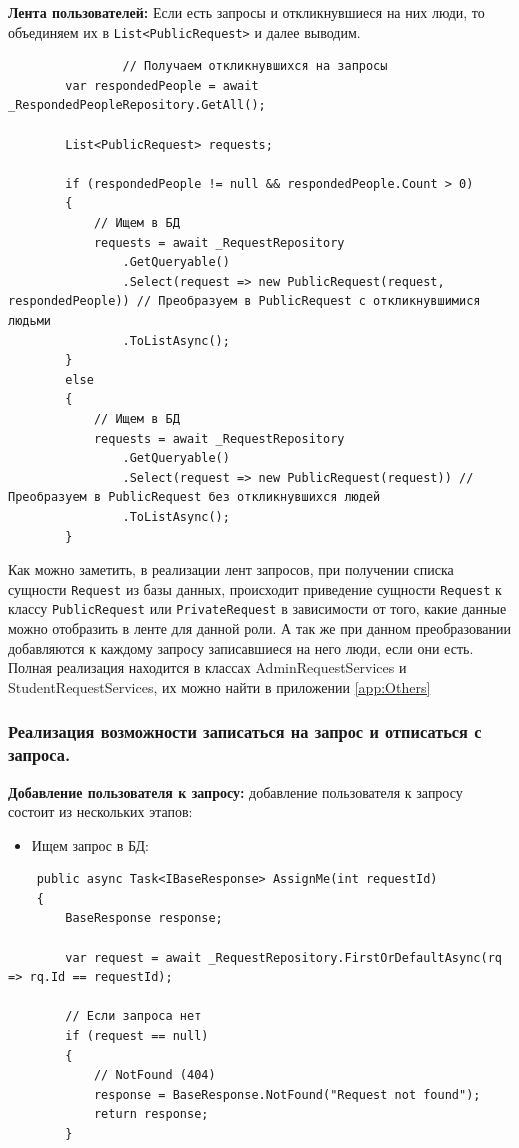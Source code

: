\textbf{Лента пользователей:}  Если есть запросы и откликнувшиеся на них люди, то объединяем их в \texttt{List<PublicRequest>} и далее выводим.
\begin{verbatim}
				// Получаем откликнувшихся на запросы
        var respondedPeople = await _RespondedPeopleRepository.GetAll();

        List<PublicRequest> requests;

        if (respondedPeople != null && respondedPeople.Count > 0)
        {
            // Ищем в БД
            requests = await _RequestRepository
                .GetQueryable()
                .Select(request => new PublicRequest(request, respondedPeople)) // Преобразуем в PublicRequest с откликнувшимися людьми
                .ToListAsync();
        }
        else
        {
            // Ищем в БД
            requests = await _RequestRepository
                .GetQueryable()
                .Select(request => new PublicRequest(request)) // Преобразуем в PublicRequest без откликнувшихся людей
                .ToListAsync();
        }
\end{verbatim}

Как можно заметить, в реализации лент запросов, при получении списка сущности \texttt{Request} из базы данных, происходит приведение сущности \texttt{Request} к классу \texttt{PublicRequest} или \texttt{PrivateRequest} в зависимости от того, какие данные можно отобразить в ленте для данной роли. А так же при данном преобразовании добавляются к каждому запросу записавшиеся на него люди, если они есть. Полная реализация находится в классах AdminRequestServices и StudentRequestServices, их можно найти в приложении \ref{app:Others}

\subsubsection{Реализация возможности записаться на запрос и отписаться с запроса.}

\textbf{Добавление пользователя к запросу:} добавление пользователя к запросу состоит из нескольких этапов:
\begin{itemize}
	\item{Ищем запрос в БД:}
\end{itemize}
\begin{verbatim}
    public async Task<IBaseResponse> AssignMe(int requestId)
    {
        BaseResponse response;

        var request = await _RequestRepository.FirstOrDefaultAsync(rq => rq.Id == requestId);

        // Если запроса нет
        if (request == null)
        {
            // NotFound (404)
            response = BaseResponse.NotFound("Request not found");
            return response;
        }

\end{verbatim}

